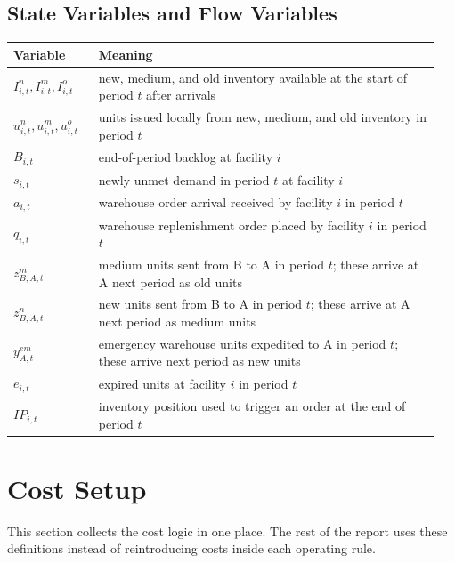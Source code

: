 \documentclass[11pt]{article}
\begin{document}
\subsection{State Variables and Flow Variables}
\begin{longtable}{>{\raggedright\arraybackslash}p{0.19\linewidth} p{0.76\linewidth}}
\toprule
Variable & Meaning \\
\midrule
$I^{n}_{i,t}, I^{m}_{i,t}, I^{o}_{i,t}$ & new, medium, and old inventory available at the start of period $t$ after arrivals \\
$u^{n}_{i,t}, u^{m}_{i,t}, u^{o}_{i,t}$ & units issued locally from new, medium, and old inventory in period $t$ \\
$B_{i,t}$ & end-of-period backlog at facility $i$ \\
$s_{i,t}$ & newly unmet demand in period $t$ at facility $i$ \\
$a_{i,t}$ & warehouse order arrival received by facility $i$ in period $t$ \\
$q_{i,t}$ & warehouse replenishment order placed by facility $i$ in period $t$ \\
$z^{m}_{B,A,t}$ & medium units sent from B to A in period $t$; these arrive at A next period as old units \\
$z^{n}_{B,A,t}$ & new units sent from B to A in period $t$; these arrive at A next period as medium units \\
$y^{em}_{A,t}$ & emergency warehouse units expedited to A in period $t$; these arrive next period as new units \\
$e_{i,t}$ & expired units at facility $i$ in period $t$ \\
$IP_{i,t}$ & inventory position used to trigger an order at the end of period $t$ \\
\bottomrule
\end{longtable}

\section{Cost Setup}
\label{sec:cost-setup}
This section collects the cost logic in one place. The rest of the report uses these definitions instead of reintroducing costs inside each operating rule.
\end{document}

